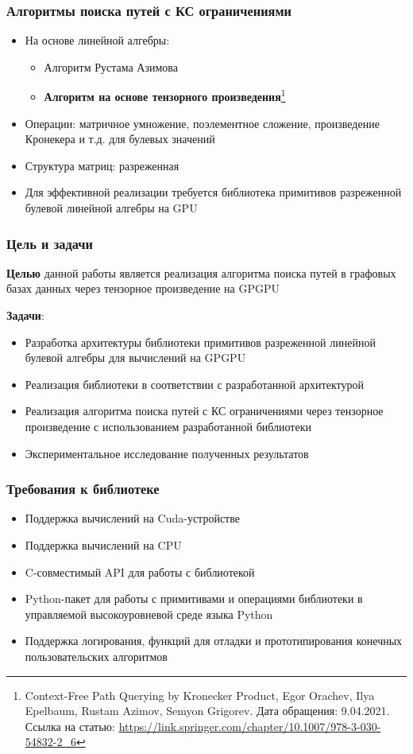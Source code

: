 \documentclass[aspectratio=169,xcolor=table,english]{beamer}
\begin{document}
\begin{frame}[fragile] \frametitle{Алгоритмы поиска путей с КС ограничениями}
    \begin{itemize}
        \item На основе линейной алгебры:
        {
        \begin{itemize}
            \item Алгоритм Рустама Азимова
            \item \textbf{Алгоритм на основе тензорного произведения}\footnote{Context-Free Path Querying by Kronecker Product, Egor Orachev, Ilya Epelbaum, Rustam  Azimov, Semyon Grigorev. Дата обращения: 9.04.2021. Ссылка на статью: \url{https://link.springer.com/chapter/10.1007/978-3-030-54832-2\_6}}
        \end{itemize}
        }
        \item Операции: матричное умножение, поэлементное сложение, произведение Кронекера и т.д. для булевых значений
        \item Структура матриц: разреженная
        \item Для эффективной реализации требуется библиотека примитивов разреженной булевой линейной алгебры на GPU
    \end{itemize}
\end{frame}

\begin{frame}[fragile] \frametitle{Цель и задачи}
    \textbf{Целью} данной работы является реализация алгоритма поиска путей в графовых базах данных через тензорное произведение на GPGPU
    
    \textbf{Задачи}:
    \begin{itemize}
        \item Разработка архитектуры библиотеки примитивов разреженной линейной булевой алгебры для вычислений на GPGPU
        \item Реализация библиотеки в соответствии с разработанной архитектурой
        \item Реализация алгоритма поиска путей с КС ограничениями через тензорное произведение с использованием разработанной библиотеки
        \item Экспериментальное исследование полученных результатов
    \end{itemize}
\end{frame}

\begin{frame}[fragile] \frametitle{Требования к библиотеке}
    \begin{itemize}
        \item Поддержка вычислений на Cuda-устройстве
        \item Поддержка вычислений на CPU
        \item C-совместимый API для работы с библиотекой
        \item Python-пакет для работы с примитивами и операциями библиотеки в управляемой высокоуровневой среде языка Python
        \item Поддержка логирования, функций для отладки и прототипирования конечных пользовательских алгоритмов
    \end{itemize}
\end{frame}
\end{document}
